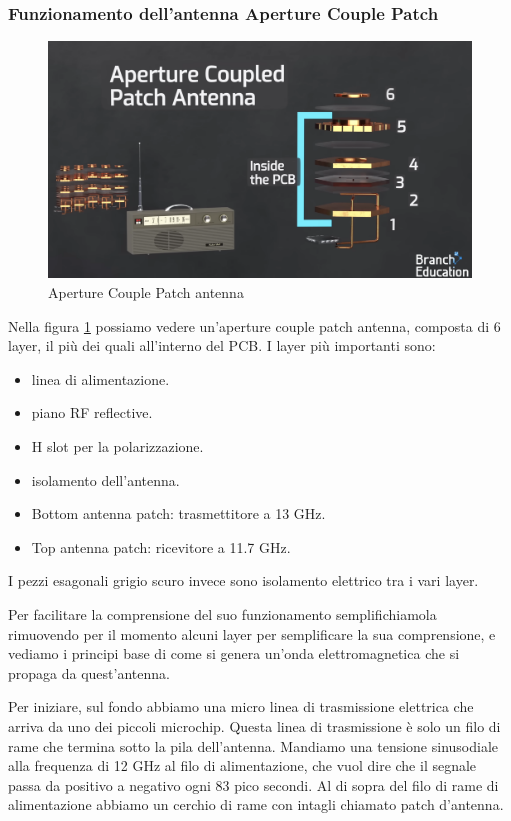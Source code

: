 \subsubsection{Funzionamento dell'antenna Aperture Couple Patch}

\begin{figure}[htbp]
  \centering
  \includegraphics[width=0.8\linewidth]{./res/img/antenna_pcb.png}
  \caption{Aperture Couple Patch antenna \cite{branch_education_how_2022}}
  \label{fig:aperture-couple-patch-antenna}
\end{figure}

Nella figura \ref{fig:aperture-couple-patch-antenna} possiamo vedere un'aperture couple patch antenna, composta di 6 layer, il più dei quali all'interno del PCB.
I layer più importanti sono:
\begin{itemize}
  \item[1] linea di alimentazione.
  \item[2] piano RF reflective.
  \item[3] H slot per la polarizzazione.
  \item[4] isolamento dell'antenna.
  \item[5] Bottom antenna patch: trasmettitore a 13 GHz.
  \item[6] Top antenna patch: ricevitore a 11.7 GHz.
\end{itemize}
I pezzi esagonali grigio scuro invece sono isolamento elettrico tra i vari layer.\cite{branch_education_how_2022}

Per facilitare la comprensione del suo funzionamento semplifichiamola rimuovendo per il momento alcuni layer per semplificare la sua comprensione, e vediamo i principi base di come si genera un'onda elettromagnetica che si propaga da quest'antenna.

Per iniziare, sul fondo abbiamo una micro linea di trasmissione elettrica che arriva da uno dei piccoli microchip.
Questa linea di trasmissione è solo un filo di rame che termina sotto la pila dell'antenna.
Mandiamo una tensione sinusodiale alla frequenza di 12 GHz al filo di alimentazione, che vuol dire che il segnale passa da positivo a negativo ogni 83 pico secondi.
Al di sopra del filo di rame di alimentazione abbiamo un cerchio di rame con intagli chiamato patch d'antenna.

